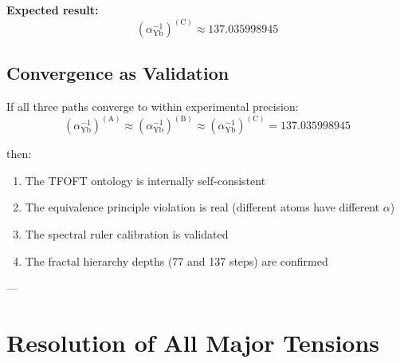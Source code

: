 \documentclass[11pt,a4paper]{article}
\begin{document}
  \noindent\textbf{Expected result:}
  \[
  \left(\alpha^{-1}_{\mathrm{Yb}}\right)^{(\mathrm{C})} \approx 137.035998945
  \]

  \subsection{Convergence as Validation}


  If all three paths converge to within experimental precision:
  \[
    \left(\alpha^{-1}_{\mathrm{Yb}}\right)^{(\mathrm{A})} \approx \left(\alpha^{-1}_{\mathrm{Yb}}\right)^{(\mathrm{B})} \approx \left(\alpha^{-1}_{\mathrm{Yb}}\right)^{(\mathrm{C})} = 137.035998945
  \]

  then:

  \begin{enumerate}

  \item The TFOFT ontology is internally self-consistent
  \item The equivalence principle violation is real (different atoms have different $\alpha$)
  \item The spectral ruler calibration is validated
  \item The fractal hierarchy depths (77 and 137 steps) are confirmed

  \end{enumerate}

---


\section{Resolution of All Major Tensions }
\end{document}
